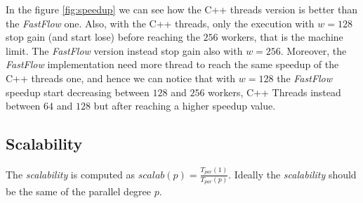 \bigskip\noindent
In the figure \ref{fig:speedup} we can see how the C++ threads version is better than the \textit{FastFlow} one. Also, with the C++ threads, only the execution with $w = 128$ stop gain (and start lose) before reaching the $256$ workers, that is the machine limit. The \textit{FastFlow} version instead stop gain also with $w = 256$. Moreover, the \textit{FastFlow} implementation need more thread to reach the same speedup of the C++ threads one, and hence we can notice that with $w = 128$ the \textit{FastFlow} speedup start decreasing between $128$ and $256$ workers, C++ Threads instead between $64$ and $128$ but after reaching a higher speedup value.



\subsection{Scalability}
The \textit{scalability} is computed as $scalab(p) = \frac{T_{par}(1)}{T_{par}(p)}$. Ideally the \textit{scalability} should be the same of the parallel degree $p$.

